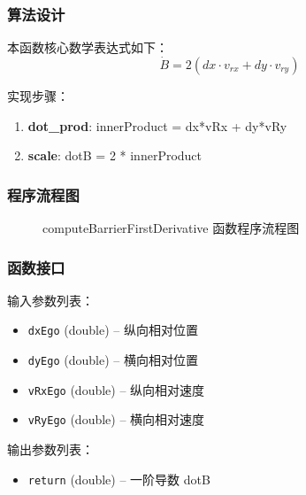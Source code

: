 \documentclass[a4paper,10pt]{article}
\begin{document}
\subsubsection{算法设计}
\par 本函数核心数学表达式如下：
\begin{equation}
\dot B = 2(dx \cdot v_{rx} + dy \cdot v_{ry})
\end{equation}
\par 实现步骤：
\begin{enumerate}
  \item \textbf{dot\_prod}: innerProduct = dx*vRx + dy*vRy
  \item \textbf{scale}: dotB = 2 * innerProduct
\end{enumerate}
\subsubsection{程序流程图}
\begin{figure}[h]
    \centering
    \caption{computeBarrierFirstDerivative 函数程序流程图}
    \label{fig:flow_computeBarrierFirstDerivative}
\end{figure}
\subsubsection{函数接口}
\par 输入参数列表：
\begin{itemize}
  \item \texttt{dxEgo} (double) -- 纵向相对位置
  \item \texttt{dyEgo} (double) -- 横向相对位置
  \item \texttt{vRxEgo} (double) -- 纵向相对速度
  \item \texttt{vRyEgo} (double) -- 横向相对速度
\end{itemize}
\par 输出参数列表：
\begin{itemize}
  \item \texttt{return} (double) -- 一阶导数 dotB
\end{itemize}
\end{document}
